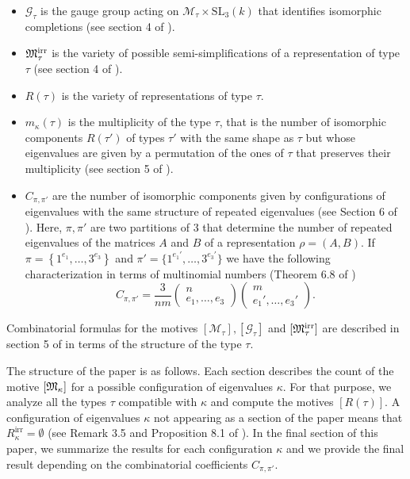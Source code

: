 \documentclass[10pt,a4paper]{amsart}
\begin{document}
\begin{itemize}
	\item $\mathcal{G}_{\tau}$ is the gauge group acting on $\mathcal{M}_{\tau} \times \mathrm{SL}_{3}(k)$ that identifies isomorphic completions (see section 4 of \cite{GPM}).
	\item ${\frak M}_{\tau}^{\textrm{irr}}$ is the variety of possible semi-simplifications of a representation of type $\tau$ (see section 4 of \cite{GPM}).
	\item $R(\tau)$ is the variety of representations of type $\tau$.
	\item $m_{\kappa}(\tau)$ is the multiplicity of the type $\tau$, that is the number of isomorphic components $R(\tau')$ of types $\tau'$ with the same shape as $\tau$ but whose eigenvalues are given by a permutation of the ones of $\tau$ that preserves their multiplicity (see section 5 of \cite{GPM}).
	\item $C_{\pi, \pi'}$ are the number of isomorphic components given by configurations of eigenvalues with the same structure of repeated eigenvalues (see Section 6 of \cite{GPM}). Here, $\pi, \pi'$ are two partitions of ${3}$ that determine the number of repeated eigenvalues of the matrices $A$ and $B$ of a representation $\rho = (A,B)$. If $\pi = \left\{1^{e_1}, \ldots, {3}^{e_{3}}\right\}$ and $\pi' = \big\{1^{e_1'}, \ldots, {3}^{e_{3}'}\big\}$ we have the following characterization in terms of multinomial numbers (Theorem 6.8 of \cite{GPM})
	$$
		C_{\pi, \pi'} = \frac{{3}}{nm} \begin{pmatrix}
	n\\
	e_1, \ldots, e_{3} \end{pmatrix}\begin{pmatrix}
	m\\
	e_1', \ldots, e_{3}'\end{pmatrix}.
	$$
\end{itemize}

Combinatorial formulas for the motives $[\mathcal{M}_{\tau}],[\mathcal{G}_{\tau}]$ and $[{\frak M}_{\tau}^{\textrm{irr}}]$ are described in section 5 of \cite{GPM} in terms of the structure of the type $\tau$.

The structure of the paper is as follows. Each section describes the count of the motive $[{\frak M}_\kappa]$ for a possible configuration of eigenvalues $\kappa$. For that purpose, we analyze all the types $\tau$ compatible with $\kappa$ and compute the motives $[R(\tau)]$. A configuration of eigenvalues $\kappa$ not appearing as a section of the paper means that $R^{\textrm{irr}}_\kappa = \emptyset$ (see Remark {3}.5 and Proposition 8.1 of \cite{GPM}). In the final section of this paper, we summarize the results for each configuration $\kappa$ and we provide the final result depending on the combinatorial coefficients $C_{\pi, \pi'}$.
\end{document}
